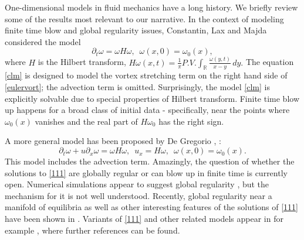 \documentclass[reqno,centertags, 11pt]{amsart}
\def \Rm {\mathbb R}
\newcommand{\be}{\mathbf e} \newcommand{\bh}{\mathbf h}
\renewcommand{\be}{\begin{equation}}
\newcommand{\ee}{\end{equation}}
\begin{document}
One-dimensional models in fluid mechanics have a long history. We briefly review some of the results most relevant to our narrative.
In the context of modeling finite time blow and global regularity issues,
Constantin, Lax and Majda \cite{CLM} considered the model
\be\label{clm}
\partial_t \omega = \omega H \omega, \,\,\,\omega(x,0) = \omega_0(x),
\ee
where $H$ is the Hilbert transform, $H \omega(x,t) = \frac{1}{\pi} P.V. \int_{\Rm} \frac{\omega(y,t)}{x-y}\,dy.$
The equation \eqref{clm} is designed to model the vortex stretching term on the right hand side of \eqref{eulervort}; the advection
term is omitted. Surprisingly, the model \eqref{clm} is explicitly solvable due to special properties of Hilbert transform.
Finite time blow up happens for a broad class of initial data - specifically, near the points where $\omega_0(x)$ vanishes and
the real part of $H \omega_0$ has the right sign.

A more general model has been proposed by De Gregorio \cite{DG1}, \cite{DG2}:
\begin{equation}\label{111}
\partial_t \omega + u \partial_x \omega = \omega H \omega,\,\,\,u_x = H\omega, \,\,\,\omega(x,0) = \omega_0(x).
\end{equation}
This model includes the advection term. Amazingly, the question of whether the solutions to \eqref{111} are globally
regular or can blow up in finite time is currently open. Numerical simulations appear to suggest global regularity \cite{OSW}, but the
mechanism for it is not well understood. Recently, global regularity near a manifold of equilibria as well as other interesting
features of the solutions of \eqref{111} have been shown in \cite{JSS}. Variants of \eqref{111} and other related models appear in
for example \cite{BKP,CasCor,EJ3,EK1,Wunsch}, where further references can be found.
\end{document}
